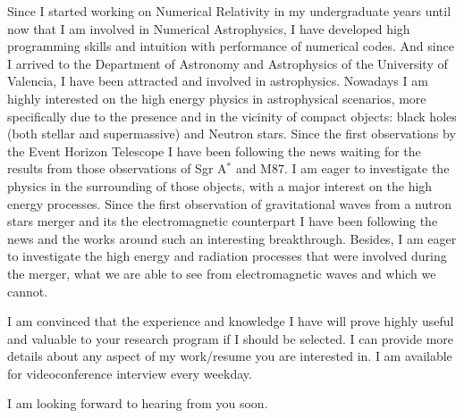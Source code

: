 Since I started working on Numerical Relativity in my undergraduate years until now that I am involved in Numerical Astrophysics, I have developed high programming skills and intuition with performance of numerical codes. And since I arrived to the Department of Astronomy and Astrophysics of the University of Valencia, I have been attracted and involved in astrophysics. Nowadays I am highly interested on the high energy physics in astrophysical scenarios, more specifically due to the presence and in the vicinity of compact objects: black holes (both stellar and supermassive) and Neutron stars. Since the first observations by the Event Horizon Telescope I have been following the news waiting for the results from those observations of Sgr A$^{*}$ and M87. I am eager to investigate the physics in the surrounding of those objects, with a major interest on the high energy processes. Since the first observation of gravitational waves from a nutron stars merger and its the electromagnetic counterpart I have been following the news and the works around such an interesting breakthrough. Besides, I am eager to investigate the high energy and radiation processes that were involved during the merger, what we are able to see from electromagnetic waves and which we cannot.

I am convinced that the experience and knowledge I have will prove highly useful and valuable to your research program if I should be selected. I can provide more details about any aspect of my work/resume you are interested in. I am available for videoconference interview every weekday.

I am looking forward to hearing from you soon.


\makeletterclosing%

